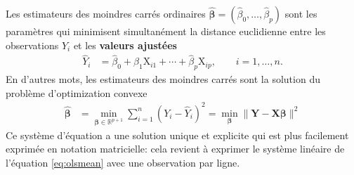 \documentclass[
  11pt,
  letterpaper,
]{article}
\theoremstyle{definition}
\theoremstyle{definition}
\theoremstyle{definition}
\theoremstyle{remark}
\begin{document}
Les estimateurs des moindres carrés ordinaires \(\widehat{\boldsymbol{\beta}}=(\widehat{\beta}_0, \ldots, \widehat{\beta}_p)\) sont les paramètres qui minimisent simultanément la distance euclidienne entre les observations \(Y_i\) et les \textbf{valeurs ajustées}
\begin{align*}
 \widehat{Y}_i &= \widehat{\beta}_0 + \widehat{\beta}_1 \mathrm{X}_{i1} + \cdots + \widehat{\beta}_p \mathrm{X}_{ip}, \qquad i =1, \ldots, n.
\end{align*}
En d'autres mots, les estimateurs des moindres carrés sont la solution du problème d'optimization convexe
\begin{align*}
\widehat{\boldsymbol{\beta}} &=\min_{\boldsymbol{\beta} \in \mathbb{R}^{p+1}}\sum_{i=1}^n (Y_i-\widehat{Y}_i)^2= \min_{\boldsymbol{\beta}} \|\boldsymbol{Y}-\mathbf{X}\boldsymbol{\beta}\|^2
\end{align*}
Ce système d'équation a une solution unique et explicite qui est plus facilement exprimée en notation matricielle: cela revient à exprimer le système linéaire de l'équation \eqref{eq:olsmean} avec une observation par ligne.
\end{document}

